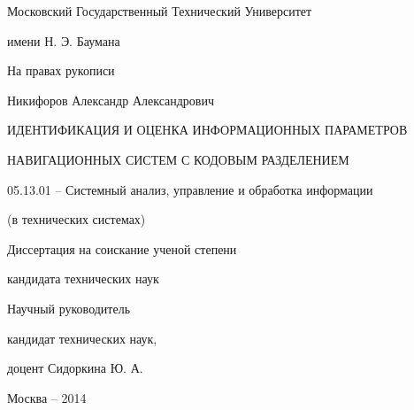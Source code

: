 \noindent\centerline{Московский Государственный Технический Университет}
\noindent\centerline{имени Н. Э. Баумана}
\vspace{\baselineskip}
\vspace{\baselineskip}

\hfill На правах рукописи

\vspace{\baselineskip}
\vspace{\baselineskip}

\noindent\centerline{Никифоров Александр Александрович}

\vspace{\baselineskip}
\vspace{\baselineskip}

\noindent\centerline{ИДЕНТИФИКАЦИЯ И ОЦЕНКА ИНФОРМАЦИОННЫХ ПАРАМЕТРОВ}
\noindent\centerline{НАВИГАЦИОННЫХ СИСТЕМ С КОДОВЫМ РАЗДЕЛЕНИЕМ}

\vspace{\baselineskip}

\noindent\centerline{05.13.01 – Системный анализ, управление и обработка информации}
\noindent\centerline{(в технических системах)}

\vspace{\baselineskip}
\vspace{\baselineskip}

\noindent\centerline{Диссертация на соискание ученой степени}
\noindent\centerline{кандидата технических наук}

\vspace{\baselineskip}
\vspace{\baselineskip}

\hfill{Научный руководитель}

\hfill{кандидат технических наук,}

\hfill{доцент Сидоркина Ю. А.}

\vfill
\noindent\centerline{Москва – 2014}

\clearpage
